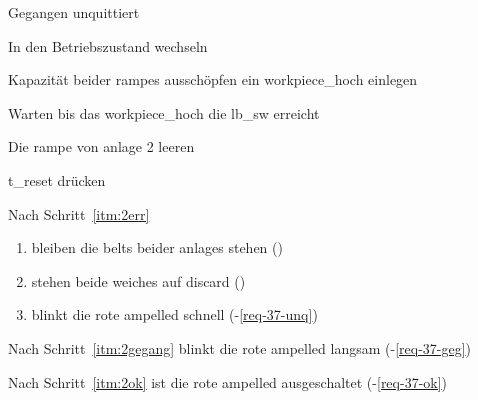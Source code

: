 \begin{ablauf}{Gegangen unquittiert}
    \item In den Betriebszustand wechseln
    \item Kapazität beider \glspl{rampe} ausschöpfen ein \gls{workpiece_hoch} einlegen
    \item \label{itm:2err} Warten bis das \gls{workpiece_hoch} die \gls{lb_sw} erreicht
    \item\label{itm:2gegang} Die \gls{rampe} von \gls{anlage} 2 leeren
    \item\label{itm:2ok} \gls{t_reset} drücken
\end{ablauf}
\begin{erwartung}
    \item Nach Schritt~\ref{itm:2err}
    \begin{enumerate}
        \item bleiben die \glspl{belt} beider \glspl{anlage} stehen ()
        \item stehen beide \glspl{weiche} auf \gls{discard} ()
        \item blinkt die rote \gls{ampelled} schnell (-\ref{req-37-unq})
    \end{enumerate}
    \item Nach Schritt~\ref{itm:2gegang} blinkt die rote \gls{ampelled} langsam (-\ref{req-37-geg})
    \item Nach Schritt~\ref{itm:2ok} ist die rote \gls{ampelled} ausgeschaltet (-\ref{req-37-ok})
\end{erwartung}

